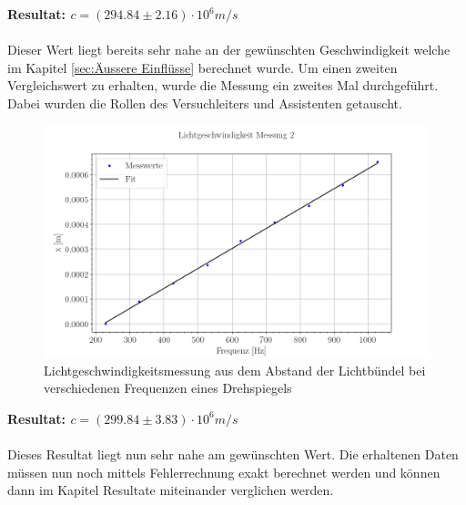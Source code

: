 \textbf{Resultat: $c = (294.84 \pm 2.16) \cdot 10^6 m/s$}\\
\\
Dieser Wert liegt bereits sehr nahe an der gewünschten Geschwindigkeit welche im Kapitel \ref{sec:Äussere Einflüsse} berechnet wurde. Um einen zweiten Vergleichswert zu erhalten, wurde die Messung ein zweites Mal durchgeführt. Dabei wurden die Rollen des Versuchleiters und Assistenten getauscht.
\clearpage

\begin{figure}[ht]
\includegraphics[width=\textwidth]{graphics/messung_2.png}
\caption{Lichtgeschwindigkeitsmessung aus dem Abstand der Lichtbündel bei verschiedenen Frequenzen eines Drehspiegels} %
\label{fig:pol1}
\end{figure}
\textbf{Resultat: $c = (299.84 \pm 3.83) \cdot 10^6 m/s$}\\
\\
Dieses Resultat liegt nun sehr nahe am gewünschten Wert. Die erhaltenen Daten müssen nun noch mittels Fehlerrechnung exakt berechnet werden und können dann im Kapitel Resultate miteinander verglichen werden.
